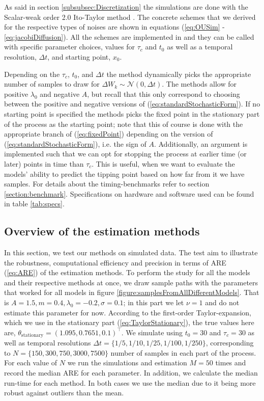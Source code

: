 As said in section \ref{subsubsec:Discretization} the simulations are done with the Scalar-weak order 2.0 Ito-Taylor method \cite[algorithm 8.5]{Srkk2019}. The concrete schemes that we derived for the respective types of noises are shown in equations (\ref{eq:OUSim} - \ref{eq:jacobiDiffusion}). All the schemes are implemented in  and they can be called with specific parameter choices, values for $\tau_c$ and $t_0$ as well as a temporal resolution, $\Delta t$,  and starting point, $x_0$. 

Depending on the $\tau_c$, $t_0$, and $\Delta t$ the method dynamically picks the appropriate number of samples to draw for $\Delta W_k\sim\mathcal{N}\left(0,\Delta t\right)$. The methods allow for positive $\lambda_0$ and negative $A$, but recall that this only correspond to choosing between the positive and negative versions of (\ref{eq:standardStochasticForm}). If no starting point is specified the methods picks the fixed point in the stationary part of the process as the starting point; note that this of course is done with the appropriate branch of (\ref{eq:fixedPoint}) depending on the version of (\ref{eq:standardStochasticForm}), i.e. the sign of $A$. Additionally, an argument is implemented such that we can opt for stopping the process at earlier time (or later) points in time than $\tau_c$. This is useful, when we want to evaluate the models' ability to predict the tipping point based on how far from it we have samples. For details about the timing-benchmarks refer to section \ref{section:benchmark}. Specifications on hardware and software used can be found in table \ref{tab:specs}. 
\subsection{Overview of the estimation methods}
In this section, we test our methods on simulated data. The test aim to illustrate the robustness, computational efficiency and precision in terms of ARE (\ref{eq:ARE}) of the estimation methods. To perform the study for all the models and their respective methods at once, we draw sample paths with the parameters that worked for all models in figure \ref{figure:samplesFromAllDifferentModels}. That is $A = 1.5, m = 0.4, \lambda_0 = -0.2, \sigma = 0.1$; in this part we let $\nu = 1$ and do not estimate this parameter for now. According to the first-order Taylor-expansion, which we use in the stationary part (\ref{eq:TaylorStationary}), the true values here are, $\theta_{\mathrm{stationary}} = (1.095, 0.7651, 0.1)^\top$. We simulate using $t_0 = 30$ and $\tau_c = 30$ as well as temporal resolutions $\Delta t = \{1/5, 1/10, 1/25, 1/100, 1/250\}$, corresponding to $N = \{150, 300, 750, 3000, 7500\}$ number of samples in each part of the process. For each value of $N$ we run the simulations and estimation $M = 50$ times and record the median ARE for each parameter. In addition, we calculate the median run-time for each method. In both cases we use the median due to it being more robust against outliers than the mean.


